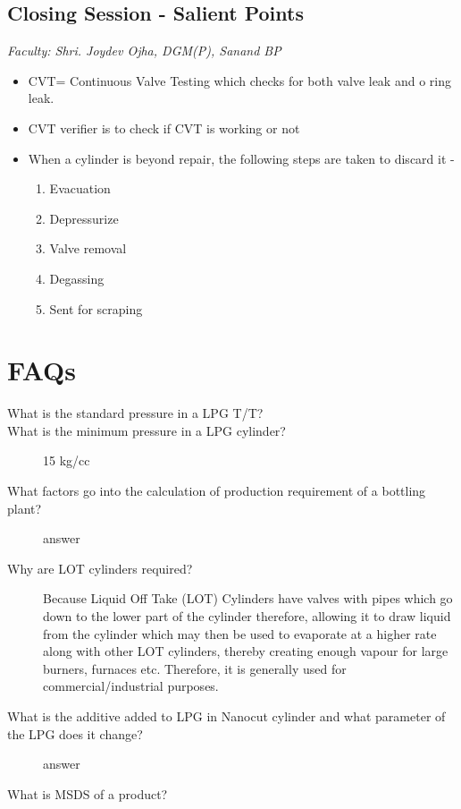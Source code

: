 \documentclass{report}
\begin{document}
	\subsection{Closing Session - Salient Points}
	\textit{Faculty: Shri. Joydev Ojha, DGM(P), Sanand BP}\\
	\begin{itemize}
	\item CVT= Continuous Valve Testing which checks for both valve leak and o ring leak.
	\item CVT verifier is to check if CVT is working or not
	\item When a cylinder is beyond repair, the following steps are taken to discard it - 
	\begin{enumerate}
		\item Evacuation
		\item Depressurize
		\item Valve removal
		\item Degassing
		\item Sent for scraping
	\end{enumerate}
	\end{itemize}
	\section{FAQs}
	\begin{description}
		\item[What is the standard pressure in a LPG T/T?] 
		\item[What is the minimum pressure in a LPG cylinder?] 15 kg/cc
		\item[What factors go into the calculation of production requirement of a bottling plant?] answer
		\item[Why are LOT cylinders required?] Because Liquid Off Take (LOT) Cylinders have valves with pipes which go down to the lower part of the cylinder therefore, allowing it to draw liquid from the cylinder which may then be used to evaporate at a higher rate along with other LOT cylinders, thereby creating enough vapour for large burners, furnaces etc. Therefore, it is generally used for commercial/industrial purposes.
		\item[What is the additive added to LPG in Nanocut cylinder and what parameter of the LPG does it change?] answer
		\item[What is MSDS of a product?]
	\end{description}
	\clearpage
	\pagebreak
\end{document}

